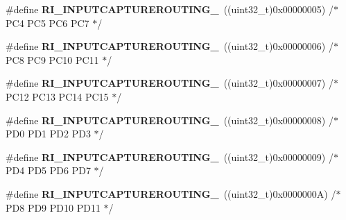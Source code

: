 \begin{DoxyCompactItemize}
\item 
\hypertarget{group___r_i___input_capture_routing_gafb8de6324b7122a1d4bc7fb853307a81}{\#define {\bfseries R\-I\-\_\-\-I\-N\-P\-U\-T\-C\-A\-P\-T\-U\-R\-E\-R\-O\-U\-T\-I\-N\-G\-\_}~((uint32\-\_\-t)0x00000005) /$\ast$ P\-C4       P\-C5      P\-C6       P\-C7      $\ast$/}\label{group___r_i___input_capture_routing_gafb8de6324b7122a1d4bc7fb853307a81}

\item 
\hypertarget{group___r_i___input_capture_routing_gade2f23cfc2a4c856b45dbe2b128e9b00}{\#define {\bfseries R\-I\-\_\-\-I\-N\-P\-U\-T\-C\-A\-P\-T\-U\-R\-E\-R\-O\-U\-T\-I\-N\-G\-\_}~((uint32\-\_\-t)0x00000006) /$\ast$ P\-C8       P\-C9      P\-C10      P\-C11     $\ast$/}\label{group___r_i___input_capture_routing_gade2f23cfc2a4c856b45dbe2b128e9b00}

\item 
\hypertarget{group___r_i___input_capture_routing_ga79fd494f01ecf2baec69456f1d51ec20}{\#define {\bfseries R\-I\-\_\-\-I\-N\-P\-U\-T\-C\-A\-P\-T\-U\-R\-E\-R\-O\-U\-T\-I\-N\-G\-\_}~((uint32\-\_\-t)0x00000007) /$\ast$ P\-C12      P\-C13     P\-C14      P\-C15     $\ast$/}\label{group___r_i___input_capture_routing_ga79fd494f01ecf2baec69456f1d51ec20}

\item 
\hypertarget{group___r_i___input_capture_routing_ga0009e0d13359feffaa8d23155fc73eba}{\#define {\bfseries R\-I\-\_\-\-I\-N\-P\-U\-T\-C\-A\-P\-T\-U\-R\-E\-R\-O\-U\-T\-I\-N\-G\-\_}~((uint32\-\_\-t)0x00000008) /$\ast$ P\-D0       P\-D1      P\-D2       P\-D3      $\ast$/}\label{group___r_i___input_capture_routing_ga0009e0d13359feffaa8d23155fc73eba}

\item 
\hypertarget{group___r_i___input_capture_routing_ga69e503bb9c7b93e4527e3b9dfc99f0ed}{\#define {\bfseries R\-I\-\_\-\-I\-N\-P\-U\-T\-C\-A\-P\-T\-U\-R\-E\-R\-O\-U\-T\-I\-N\-G\-\_}~((uint32\-\_\-t)0x00000009) /$\ast$ P\-D4       P\-D5      P\-D6       P\-D7      $\ast$/}\label{group___r_i___input_capture_routing_ga69e503bb9c7b93e4527e3b9dfc99f0ed}

\item 
\hypertarget{group___r_i___input_capture_routing_gab4f455ce0bd7f6b9d039d8b3b397d515}{\#define {\bfseries R\-I\-\_\-\-I\-N\-P\-U\-T\-C\-A\-P\-T\-U\-R\-E\-R\-O\-U\-T\-I\-N\-G\-\_}~((uint32\-\_\-t)0x0000000\-A) /$\ast$ P\-D8       P\-D9      P\-D10      P\-D11     $\ast$/}\label{group___r_i___input_capture_routing_gab4f455ce0bd7f6b9d039d8b3b397d515}


\end{DoxyCompactItemize}

